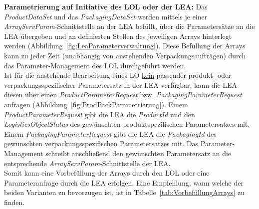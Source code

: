 \textbf{Parametrierung auf Initiative des LOL oder der LEA:} Das \emph{ProductDataSet} und das \emph{PackagingDataSet} werden mittels je einer \emph{ArrayServParam}-Schnittstelle an der LEA befüllt, über die Parametersätze an die LEA übergeben und an definierten Stellen des jeweiligen Arrays hinterlegt werden (Abbildung~\ref{fig:LeaParameterverwaltung}). Diese Befüllung der Arrays kann zu jeder Zeit (unabhängig von anstehenden Verpackungsaufträgen) durch das Parameter-Management des LOL durchgeführt werden. \\
Ist für die anstehende Bearbeitung eines LO \underline{kein} passender produkt- oder verpackungsspezifischer Parametersatz in der LEA verfügbar, kann die LEA diesen über einen \emph{ProductParameterRequest} bzw. \emph{PackagingParameterRequest} anfragen (Abbildung~\ref{fig:ProdPackParametrierung}). Einem \emph{ProductParameterRequest} gibt die LEA die \emph{ProductId} und den \emph{LogisticsObjectStatus} des gewünschten produktspezifischen Parametersatzes mit. Einem \emph{PackagingParameterRequest} gibt die LEA die \emph{PackagingId} des gewünschten verpackungsspezifischen Parametersatzes mit. Das Parameter-Management schreibt anschließend den gewünschten Parametersatz an die entsprechende \emph{ArrayServParam}-Schnittstelle der LEA. \\
Somit kann eine Vorbefüllung der Arrays durch den LOL oder eine Parameteranfrage durch die LEA erfolgen. Eine Empfehlung, wann welche der beiden Varianten zu bevorzugen ist, ist in Tabelle~\ref{tab:VorbefüllungArrays} zu finden. 

